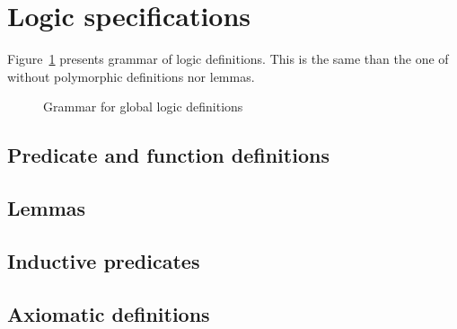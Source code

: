 
\section{Logic specifications}
\label{sec:logicspec}


Figure~\ref{fig:gram:logic} presents grammar of logic definitions. This is the
same than the one of \acsl without polymorphic definitions nor lemmas.

\begin{figure}[htbp]
  \caption{Grammar for global logic definitions}
\label{fig:gram:logic}
\end{figure}


\subsection{Predicate and function definitions}
\nodiff


\subsection{Lemmas}
\absent


\subsection{Inductive predicates}
\absent


\subsection{Axiomatic definitions}
\absent

